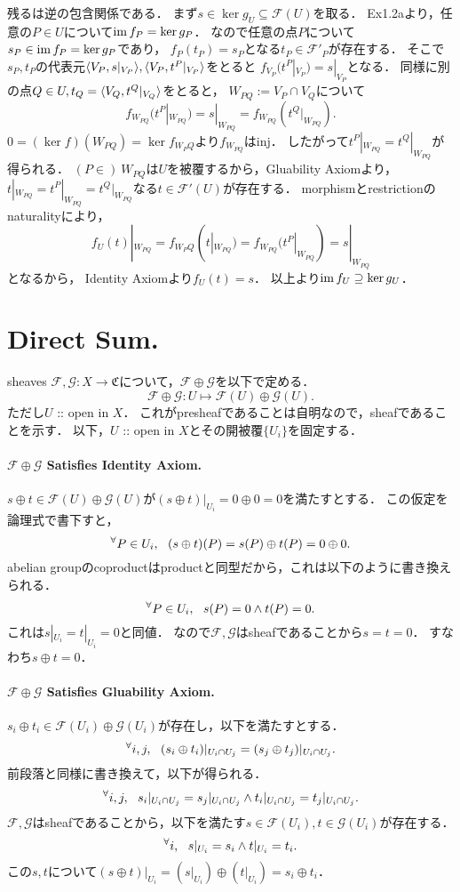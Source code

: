 \documentclass[a4paper]{jsarticle}
\newcommand{\shF}{\mathcal{F}}
\newcommand{\shG}{\mathcal{G}}
\begin{document}
    残るは逆の包含関係である．
    まず$s \in \ker g_U \subseteq \shF(U)$を取る．
    Ex1.2aより，任意の$P \in U$について$\operatorname{im} f_P=\ker g_P$．
    なので任意の点$P$について$s_P \in \operatorname{im} f_P=\ker g_P$であり，
    $f_P(t_P)=s_P$となる$t_P \in \shF'_P$が存在する．
    そこで$s_P,t_P$の代表元$\langle V_P,s|_{V_P} \rangle, \langle V_P,t^P|_{V_P} \rangle$をとると
    $f_{V_P}(t^P|_{V_P})=s|_{V_P}$となる．
    同様に別の点$Q \in U, t_Q=\langle V_Q,t^Q|_{V_Q} \rangle$をとると，
    $W_{PQ}:=V_P \cap V_Q$について
    \[ f_{W_{PQ}}(t^P|_{W_{PQ}})=s|_{W_{PQ}}=f_{W_{PQ}}(t^Q|_{W_{PQ}}). \]
    $0=(\ker f)(W_{PQ})=\ker f_{W_PQ}$より$f_{W_{PQ}}$はinj．
    したがって$t^P|_{W_{PQ}}=t^Q|_{W_{PQ}}$が得られる．
    $(P \in)~W_{PQ}$は$U$を被覆するから，Gluability Axiomより，
    $t|_{W_{PQ}}=t^P|_{W_{PQ}}=t^Q|_{W_{PQ}}$なる$t \in \shF'(U)$が存在する．
    morphismとrestrictionのnaturalityにより，
    \[ f_{U}(t)|_{W_{PQ}}=f_{W_PQ}(t|_{W_{PQ}})=f_{W_{PQ}}(t^P|_{W_{PQ}})=s|_{W_{PQ}} \]となるから，
    Identity Axiomより$f_{U}(t)=s$．
    以上より$\operatorname{im} f_U \supseteq \ker g_U$．

\section{Direct Sum.} %
    sheaves $\shF,\shG: X \to \mathfrak{C}$について，$\shF \oplus \shG$を以下で定める．
    \[ \shF \oplus \shG: U \mapsto \shF(U) \oplus \shG(U). \]
    ただし$U$ :: open in $X$．
    これがpresheafであることは自明なので，sheafであることを示す．
    以下，$U$ :: open in $X$とその開被覆$\{U_i\}$を固定する．

    \paragraph{$\shF \oplus \shG$ Satisfies Identity Axiom.}
    $s \oplus t \in \shF(U) \oplus \shG(U)$が$(s \oplus t)|_{U_i}=0 \oplus 0=0$を満たすとする．
    この仮定を論理式で書下すと，
    \[ {}^{\forall} P \in U_i,~~ (s \oplus t)(P)=s(P) \oplus t(P)=0 \oplus 0. \]
    abelian groupのcoproductはproductと同型だから，これは以下のように書き換えられる．
    \[ {}^{\forall} P \in U_i,~~ s(P)=0 \land t(P)=0. \]
    これは$s|_{U_i}=t|_{U_i}=0$と同値．
    なので$\shF,\shG$はsheafであることから$s=t=0$．
    すなわち$s \oplus t=0$．

    \paragraph{$\shF \oplus \shG$ Satisfies Gluability Axiom.}
    $s_i \oplus t_i \in \shF(U_i) \oplus \shG(U_i)$が存在し，以下を満たすとする．
    \[ {}^{\forall} i,j,~~ (s_i \oplus t_i)|_{U_i \cap U_j}=(s_j \oplus t_j)|_{U_i \cap U_j}. \]
    前段落と同様に書き換えて，以下が得られる．
    \[ {}^{\forall} i,j,~~ s_i|_{U_i \cap U_j}=s_j|_{U_i \cap U_j} \land t_i|_{U_i \cap U_j}=t_j|_{U_i \cap U_j}. \]
    $\shF,\shG$はsheafであることから，以下を満たす$s \in \shF(U_i),t \in \shG(U_i)$が存在する．
    \[ {}^{\forall} i,~~ s|_{U_i}=s_i \land t|_{U_i}=t_i. \]
    この$s,t$について$(s \oplus t)|_{U_i}=(s|_{U_i}) \oplus (t|_{U_i})=s_i \oplus t_i$．
\end{document}
